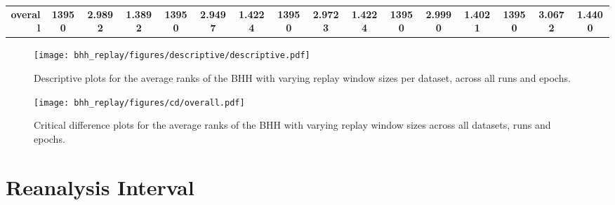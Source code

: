 \begin{table}[htbp]
{\begin{tabular}{rccccccccccccccc}
			\midrule
			\textbf{overall}                    & \textbf{13950}                      & \textbf{2.9892}                                                           & \textbf{1.3892} & \textbf{13950}                 & \cellcolor[rgb]{ .776,  .937,  .808}\textcolor[rgb]{ 0,  .38,  0}{\textbf{2.9497}} & \textbf{1.4224} & \textbf{13950}                  & \textbf{2.9723}                                                           & \textbf{1.4224} & \textbf{13950}                  & \textbf{2.9990}                                                           & \textbf{1.4021} & \textbf{13950}                  & \textbf{3.0672} & \textbf{1.4400} \\
		\end{tabular}%
	}
\end{table}%

\begin{figure}[htbp]
	\centering
	\texttt{[image: bhh\_replay/figures/descriptive/descriptive.pdf]}
	\caption{Descriptive plots for the average ranks of the \acs{BHH} with varying replay window sizes per dataset, across all runs and epochs.}
	\label{fig:results:replay:descriptive:descriptive}
\end{figure}

\begin{figure}[htbp]
	\centering
	\texttt{[image: bhh\_replay/figures/cd/overall.pdf]}
	\caption{Critical difference plots for the average ranks of the \acs{BHH} with varying replay window sizes across all datasets, runs and epochs.}
	\label{fig:results:replay:descriptive:cd}
\end{figure}

\section{Reanalysis Interval}\label{sec:results:bhh_variant_reanalysis}

